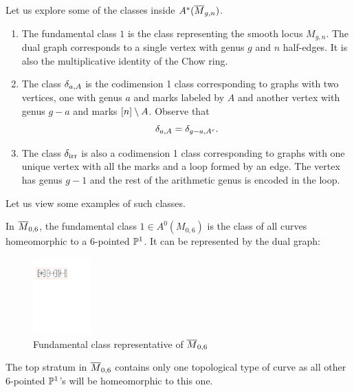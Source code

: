 \documentclass[12pt]{memoir}
\begin{document}
Let us explore some of the classes inside $A^\ast(\overline M_{g,n})$. 
\begin{enumerate}
    \item The fundamental class $1$ is the class representing the smooth locus $M_{g,n}$. The dual graph corresponds to a single vertex with genus $g$ and $n$ half-edges. It is also the multiplicative identity of the Chow ring.
    \item The class $\delta_{a,A}$ is the codimension 1 class corresponding to graphs with two vertices, one with genus $a$ and marks labeled by $A$ and another vertex with genus $g-a$ and marks $\left\lbrack n\right\rbrack\setminus A$. Observe that 
    $$\delta_{a,A}=\delta_{g-a,A^c}.$$
    \item The class $\delta_{\text{irr}}$ is also a codimension 1 class corresponding to graphs with one unique vertex with all the marks and a loop formed by an edge. The vertex has genus $g-1$ and the rest of the arithmetic genus is encoded in the loop.
\end{enumerate}

Let us view some examples of such classes.

\begin{Ex}
    In $\overline M_{0,6}$, the fundamental class $1\in A^0(M_{0,6})$ is the class of all curves homeomorphic to a 6-pointed $\mathbb{P}^1$. It can be represented by the dual graph:\par
    \begin{figure}[h!]
        \centering
        \includegraphics[width=0.2\textwidth, trim= 1.32cm 20.75cm 16.53cm 3.9cm,clip]{../figs/FigsDNnotability.pdf}
        \caption{Fundamental class representative of $\overline{M}_{0,6}$}
        \label{fig:fundamental-class-M06}
    \end{figure} 
    The top stratum in $\overline M_{0,6}$ contains only one topological type of curve as all other $6$-pointed $\mathbb{P}^1$'s will be homeomorphic to this one.
\end{Ex}
\end{document}
